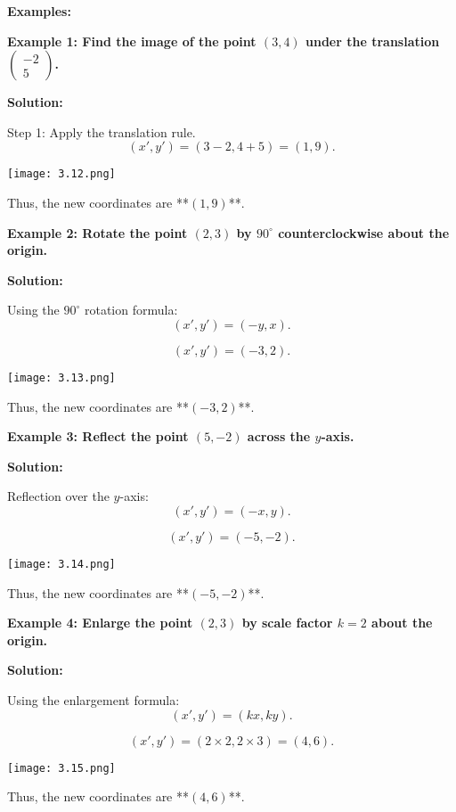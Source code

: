 \textbf{Examples:}

\begin{flushleft}
	\textbf{Example 1: Find the image of the point $(3, 4)$ under the translation $\begin{pmatrix} -2 \\ 5 \end{pmatrix}$.}
	
	\textbf{Solution:}
	
	Step 1: Apply the translation rule.
	\[
	(x', y') = (3 - 2, 4 + 5) = (1, 9).
	\]
	\begin{center}
		\texttt{[image: 3.12.png]}
	\end{center}
	
	
	Thus, the new coordinates are **$(1,9)$**.
\end{flushleft}

\begin{flushleft}
	\textbf{Example 2: Rotate the point $(2,3)$ by $90^\circ$ counterclockwise about the origin.}
	
	\textbf{Solution:}
	
	Using the $90^\circ$ rotation formula:
	\[
	(x', y') = (-y, x).
	\]
	
	\[
	(x', y') = (-3,2).
	\]
	\begin{center}
		\texttt{[image: 3.13.png]}
	\end{center}
	
	Thus, the new coordinates are **$(-3,2)$**.
\end{flushleft}

\begin{flushleft}
	\textbf{Example 3: Reflect the point $(5, -2)$ across the $y$-axis.}
	
	\textbf{Solution:}
	
	Reflection over the $y$-axis:
	\[
	(x', y') = (-x, y).
	\]
	
	\[
	(x', y') = (-5, -2).
	\]
	\begin{center}
		\texttt{[image: 3.14.png]}
	\end{center}
	Thus, the new coordinates are **$(-5,-2)$**.
\end{flushleft}

\begin{flushleft}
	\textbf{Example 4: Enlarge the point $(2, 3)$ by scale factor $k=2$ about the origin.}
	
	\textbf{Solution:}
	
	Using the enlargement formula:
	\[
	(x', y') = (kx, ky).
	\]
	
	\[
	(x', y') = (2 \times 2, 2 \times 3) = (4,6).
	\]
	\begin{center}
		\texttt{[image: 3.15.png]}
	\end{center}
	Thus, the new coordinates are **$(4,6)$**.
\end{flushleft}

